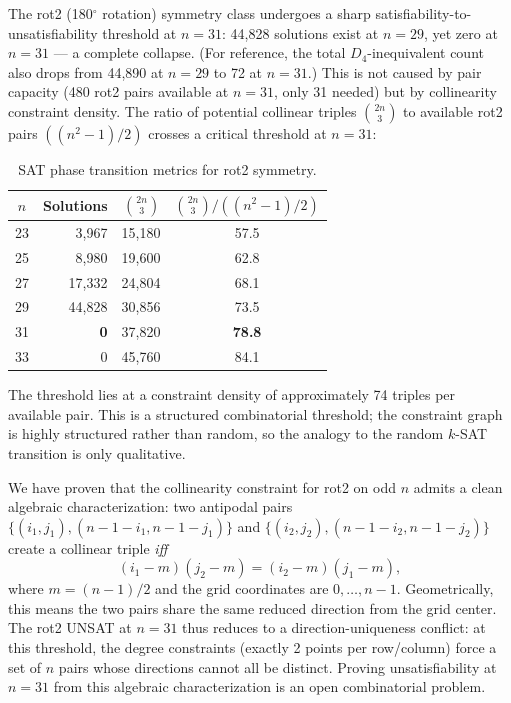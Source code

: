 \documentclass[11pt,a4paper]{article}
\theoremstyle{plain}
\theoremstyle{definition}
\begin{document}
The rot2 (180$^\circ$ rotation) symmetry class undergoes a sharp satisfiability-to-unsatisfiability threshold at $n=31$: 44,828 solutions exist at $n=29$, yet zero at $n=31$ --- a complete collapse. (For reference, the total $D_4$-inequivalent count also drops from 44,890 at $n=29$ to 72 at $n=31$.) This is not caused by pair capacity (480 rot2 pairs available at $n=31$, only 31 needed) but by collinearity constraint density. The ratio of potential collinear triples $\binom{2n}{3}$ to available rot2 pairs $((n^2-1)/2)$ crosses a critical threshold at $n=31$:

\begin{table}[H]
\centering
\caption{SAT phase transition metrics for rot2 symmetry.}
\label{tab:rot2transition}
\begin{tabular}{crrc}
\toprule
$n$ & Solutions & $\binom{2n}{3}$ & $\binom{2n}{3} / ((n^2-1)/2)$ \\
\midrule
23 & 3,967 & 15,180 & 57.5 \\
25 & 8,980 & 19,600 & 62.8 \\
27 & 17,332 & 24,804 & 68.1 \\
29 & 44,828 & 30,856 & 73.5 \\
31 & \textbf{0} & 37,820 & \textbf{78.8} \\
33 & 0 & 45,760 & 84.1 \\
\bottomrule
\end{tabular}
\end{table}

The threshold lies at a constraint density of approximately 74 triples per available pair. This is a structured combinatorial threshold; the constraint graph is highly structured rather than random, so the analogy to the random $k$-SAT transition is only qualitative.

We have proven that the collinearity constraint for rot2 on odd $n$ admits a clean algebraic characterization: two antipodal pairs $\{(i_1,j_1),(n-1-i_1,n-1-j_1)\}$ and $\{(i_2,j_2),(n-1-i_2,n-1-j_2)\}$ create a collinear triple \emph{iff}
\[
(i_1-m)(j_2-m) = (i_2-m)(j_1-m),
\]
where $m=(n-1)/2$ and the grid coordinates are $0,\dots,n-1$. Geometrically, this means the two pairs share the same reduced direction from the grid center. The rot2 UNSAT at $n=31$ thus reduces to a direction-uniqueness conflict: at this threshold, the degree constraints (exactly 2 points per row/column) force a set of $n$ pairs whose directions cannot all be distinct. Proving unsatisfiability at $n=31$ from this algebraic characterization is an open combinatorial problem.
\end{document}
